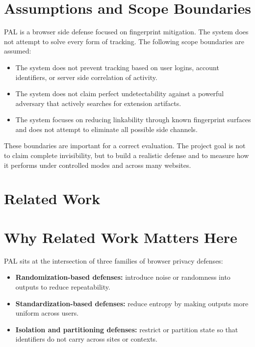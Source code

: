 \documentclass[11pt]{report}
\begin{document}
\section{Assumptions and Scope Boundaries}

PAL is a browser side defense focused on fingerprint mitigation. The system does not attempt to solve every form of tracking. The following scope boundaries are assumed:

\begin{itemize}
    \item The system does not prevent tracking based on user logins, account identifiers, or server side correlation of activity.
    \item The system does not claim perfect undetectability against a powerful adversary that actively searches for extension artifacts.
    \item The system focuses on reducing linkability through known fingerprint surfaces and does not attempt to eliminate all possible side channels.
\end{itemize}

These boundaries are important for a correct evaluation. The project goal is not to claim complete invisibility, but to build a realistic defense and to measure how it performs under controlled modes and across many websites.



\section{Related Work}

\section{Why Related Work Matters Here}

PAL sits at the intersection of three families of browser privacy defenses:

\begin{itemize}
    \item \textbf{Randomization-based defenses:} introduce noise or randomness into outputs to reduce repeatability.
    \item \textbf{Standardization-based defenses:} reduce entropy by making outputs more uniform across users.
    \item \textbf{Isolation and partitioning defenses:} restrict or partition state so that identifiers do not carry across sites or contexts.
\end{itemize}
\end{document}
